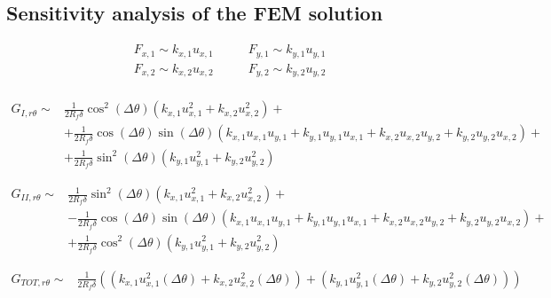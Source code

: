 \documentclass[a4paper]{jpconf}
\begin{document}
\subsection{Sensitivity analysis of the FEM solution}

\begin{equation}
\begin{split}
F_{x,1}\sim k_{x,1}u_{x,1}&\qquad F_{y,1}\sim k_{y,1}u_{y,1}\\
F_{x,2}\sim k_{x,2}u_{x,2}&\qquad F_{y,2}\sim k_{y,2}u_{y,2}\\
\end{split}
\end{equation}

\begin{equation}
\begin{split}
G_{I,r\theta} \sim &\frac{1}{2R_{f}\delta}\cos^{2}\left(\Delta\theta\right)\left(k_{x,1}u^{2}_{x,1}+k_{x,2}u^{2}_{x,2}\right)+\\
&+\frac{1}{2R_{f}\delta}\cos\left(\Delta\theta\right)\sin\left(\Delta\theta\right)\left(k_{x,1}u_{x,1}u_{y,1}+k_{y,1}u_{y,1}u_{x,1}+k_{x,2}u_{x,2}u_{y,2}+k_{y,2}u_{y,2}u_{x,2}\right)+\\
&+\frac{1}{2R_{f}\delta}\sin^{2}\left(\Delta\theta\right)\left(k_{y,1}u^{2}_{y,1}+k_{y,2}u^{2}_{y,2}\right)
\end{split}
\end{equation}

\begin{equation}
\begin{split}
G_{II,r\theta} \sim &\frac{1}{2R_{f}\delta}\sin^{2}\left(\Delta\theta\right)\left(k_{x,1}u^{2}_{x,1}+k_{x,2}u^{2}_{x,2}\right)+\\
&-\frac{1}{2R_{f}\delta}\cos\left(\Delta\theta\right)\sin\left(\Delta\theta\right)\left(k_{x,1}u_{x,1}u_{y,1}+k_{y,1}u_{y,1}u_{x,1}+k_{x,2}u_{x,2}u_{y,2}+k_{y,2}u_{y,2}u_{x,2}\right)+\\
&+\frac{1}{2R_{f}\delta}\cos^{2}\left(\Delta\theta\right)\left(k_{y,1}u^{2}_{y,1}+k_{y,2}u^{2}_{y,2}\right)
\end{split}
\end{equation}

\begin{equation}
\begin{split}
G_{TOT,r\theta} \sim &\frac{1}{2R_{f}\delta}\left(\left(k_{x,1}u^{2}_{x,1}\left(\Delta\theta\right)+k_{x,2}u^{2}_{x,2}\left(\Delta\theta\right)\right)+\left(k_{y,1}u^{2}_{y,1}\left(\Delta\theta\right)+k_{y,2}u^{2}_{y,2}\left(\Delta\theta\right)\right)\right)
\end{split}
\end{equation}
\end{document}
